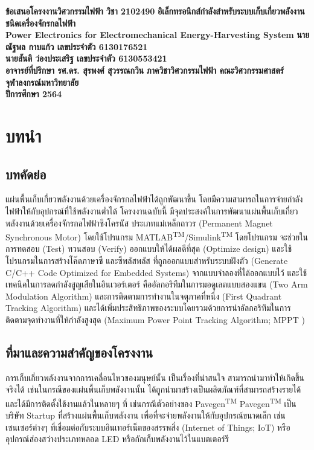 \documentclass[11pt,a4paper]{article}
\begin{document}
\thispagestyle{empty}
\begin{center}
    \doublespacing
    {\LARGE \bf ข้อเสนอโครงงานวิศวกรรมไฟฟ้า วิชา 2102490}
    \vfill
    {
        \LARGE \bf
        อิเล็กทรอนิกส์กำลังสำหรับระบบเก็บเกี่ยวพลังงานชนิดเครื่องจักรกลไฟฟ้า \\[2ex]
        Power Electronics for Electromechanical Energy-Harvesting System
    }
    \vfill
    {\LARGE \bf นายณัฐพล กาบแก้ว เลขประจำตัว 6130176521}\\[2ex]
    {\LARGE \bf นายสันติ ว่องประเสริฐ เลขประจำตัว 6130553421}\\[2ex]
    {\LARGE \bf อาจารย์ที่ปรึกษา รศ.ดร. สุรพงศ์ สุวรรณกวิน}
    \vfill
    {\LARGE \bf ภาควิชาวิศวกรรมไฟฟ้า คณะวิศวกรรมศาสตร์}\\[2ex]
    {\LARGE \bf จุฬาลงกรณ์มหาวิทยาลัย}\\[2ex]
    {\LARGE \bf ปีการศึกษา 2564}
\end{center}

\newpage
\thispagestyle{empty}
\tableofcontents

\newpage
\setcounter{page}{1}
\section{บทนำ}
\subsection{บทคัดย่อ}
แผ่นพื้นเก็บเกี่ยวพลังงานด้วยเครื่องจักรกลไฟฟ้าได้ถูกพัฒนาขึ้น โดยมีความสามารถในการจ่ายกำลังไฟฟ้าให้กับอุปกรณ์ที่ใช้พลังงานต่ำได้ โครงงานฉบับนี้ มีจุดประสงค์ในการพัฒนาแผ่นพื้นเก็บเกี่ยวพลังงานด้วยเครื่องจักรกลไฟฟ้าซิงโครนัส ประเภทแม่เหล็กถาวร (Permanent Magnet Synchronous Motor) โดยใช้โปรแกรม MATLAB\textsuperscript{TM}/Simulink\textsuperscript{TM} โดยโปรแกรม จะช่วยในการทดสอบ (Test) ทวนสอบ (Verify) ออกแบบให้ได้ผลดีที่สุด (Optimize design) และใช้โปรแกรมในการสร้างโค๊ดภาษาซี และซีพลัสพลัส ที่ถูกออกแบบสำหรับระบบฝังตัว (Generate C/C++ Code Optimized for Embedded Systems)  จากแบบจำลองที่ได้ออกแบบไว้ และใช้เทคนิคในการลดกำลังสูญเสียในอินเวอร์เตอร์ คืออัลกอริทึมในการมอดูเลตแบบสองแขน (Two Arm Modulation Algorithm) และการติดตามการทำงานในจตุภาคที่หนึ่ง (First Quadrant Tracking Algorithm) และได้เพิ่มประสิทธิภาพของระบบโดยรวมด้วยการนำอัลกอริทึมในการติดตามจุดทำงานที่ให้กำลังสูงสุด (Maximum Power Point Tracking Algorithm; MPPT )

\subsection{ที่มาและความสำคัญของโครงงาน}
การเก็บเกี่ยวพลังงานจากการเคลื่อนไหวของมนุษย์นั้น เป็นเรื่องที่น่าสนใจ สามารถนำมาทำให้เกิดขึ้นจริงได้ เช่นในกรณีของแผ่นพื้นเก็บพลังงานนั้น ได้ถูกนำมาสร้างเป็นผลิตภัณฑ์ที่สามารถสร้างรายได้ และได้มีการติดตั้งใช้งานแล้วในหลายๆ ที่ เช่นกรณีตัวอย่างของ Pavegen\textsuperscript{TM} Pavegen\textsuperscript{TM} เป็นบริษัท Startup ที่สร้างแผ่นพื้นเก็บพลังงาน เพื่อที่จะจ่ายพลังงานให้กับอุปกรณ์ขนาดเล็ก เช่น เซนเซอร์ต่างๆ ที่เชื่อมต่อกับระบบอินเทอร์เน็ตของสรรพสิ่ง (Internet of Things; IoT) หรืออุปกรณ์ส่องสว่างประเภทหลอด LED หรือกักเก็บพลังงานไว้ในแบตเตอร์รี
\end{document}
